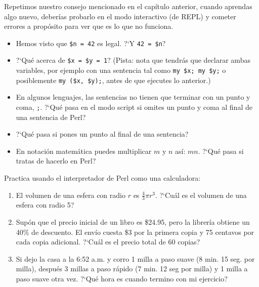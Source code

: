 \begin{exercise}

Repetimos nuestro consejo mencionado en el capítulo anterior,
cuando aprendas algo nuevo, deberías probarlo en el modo interactivo
(de REPL) y cometer errores a propósito para ver que es lo que no funciona.

\begin{itemize}

\item Hemos visto que {\tt \$n = 42} es legal. ?`Y {\tt 42 = \$n}?

\item ?`Qué acerca de {\tt \$x = \$y = 1}? (Pista: nota que 
tendrás que declarar ambas variables, por ejemplo con una sentencia
tal como {\tt my \$x; my \$y;} o posiblemente {\tt my (\$x, \$y);},
antes de que ejecutes lo anterior.)

\item En algunos lenguajes, las sentencias no tienen que terminar con un
punto y coma, {\tt ;}. ?`Qué pasa en el modo script si omites un punto y
coma al final de una sentencia de Perl?

\item ?`Qué pasa si pones un punto al final de una sentencia?

\item En notación matemática puedes multiplicar $m$ y $n$ así: $m n$.
?`Qué pasa si tratas de hacerlo en Perl?

\end{itemize}

\end{exercise}


\begin{exercise}

Practica usando el interpretador de Perl como una calculadora:

\begin{enumerate}

\item El volumen de una esfera con radio $r$ es $\frac{4}{3} \pi r^3$.
?`Cuál es el volumen de una esfera con radio 5?

\item Supón que el precio inicial de un libro es \$24.95,
pero la librería obtiene un 40\% de descuento. El envío
cuesta \$3 por la primera copia y 75 centavos por cada copia adicional.
?`Cuál es el precio total de 60 copias?

\item Si dejo la casa a la 6:52 a.m. y corro 1 milla a paso suave
(8 min. 15 seg. por milla), después 3 millas a paso rápido 
(7 min. 12 seg por milla) y 1 milla a paso suave otra vez.
?`Qué hora es cuando termino con mi ejercicio?

\end{enumerate}
\end{exercise}

